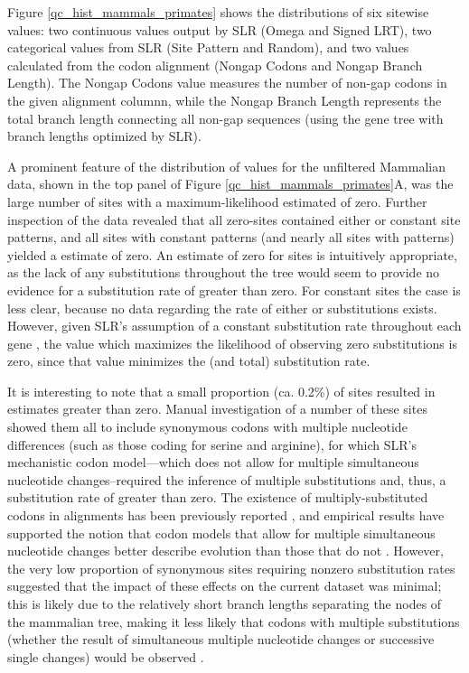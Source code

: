 Figure \ref{qc_hist_mammals_primates} shows the distributions of six
sitewise values: two continuous values output by SLR (Omega and Signed
LRT), two categorical values from SLR (Site Pattern and Random), and
two values calculated from the codon alignment (Nongap Codons and
Nongap Branch Length). The Nongap Codons value measures the number of
non-gap codons in the given alignment columnn, while the Nongap
Branch Length represents the total branch length connecting all non-gap
sequences (using the gene tree with branch lengths optimized by SLR).

A prominent feature of the distribution of \omg values for the
unfiltered Mammalian data, shown in the top panel of Figure
\ref{qc_hist_mammals_primates}A, was the large number of sites with a
maximum-likelihood estimated \omg of zero. Further inspection of the
data revealed that all zero-\omg sites contained either \syn or
constant site patterns, and all sites with constant patterns (and
nearly all sites with \syn patterns) yielded a \ml \omg estimate of
zero. An estimate of zero for \syn sites is intuitively appropriate,
as the lack of any \nsyn substitutions throughout the tree would seem
to provide no evidence for a \nsyn substitution rate of greater than
zero. For constant sites the case is less clear, because no data
regarding the rate of either \syn or \nsyn substitutions
exists. However, given SLR's assumption of a constant \syn
substitution rate throughout each gene \citep{Massingham2005},
the \omg value which maximizes the likelihood of observing zero
substitutions is zero, since that value minimizes the \nsyn (and
total) substitution rate.

It is interesting to note that a small proportion (ca. 0.2\%) of \syn
sites resulted in \ml estimates greater than zero. Manual
investigation of a number of these sites   showed them
all to include synonymous codons with multiple nucleotide differences
(such as those coding for serine and arginine), for which SLR's
mechanistic codon model---which does not allow for multiple
simultaneous nucleotide changes--required the inference of multiple
\nsyn substitutions and, thus, a \nsyn substitution rate of greater
than zero. The existence of multiply-substituted codons in alignments
has been previously reported \citep{Averof2000,Whelan2004}, and
empirical results have supported the notion that codon models that
allow for multiple simultaneous nucleotide changes better describe
evolution than those that do not \citep{Kosiol2007}. However, the very
low proportion of synonymous sites requiring nonzero \nsyn
substitution rates suggested that the impact of these effects on the
current dataset was minimal; this is likely due to the relatively
short branch lengths separating the nodes of the mammalian tree,
making it less likely that codons with multiple substitutions (whether
the result of simultaneous multiple nucleotide changes or successive
single changes) would be observed \citep{Kosiol2007}.

